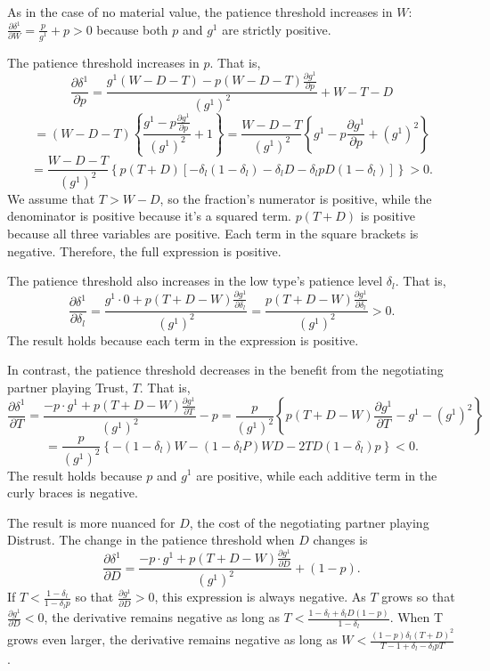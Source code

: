 \documentclass[bibtex,autowc]{apsr_submission}
\newcommand{\de}{\delta}
\begin{document}
{As in the case of no material value, the patience threshold increases in $W$: $\frac{\partial \delta^1}{\partial W} = \frac{p}{g^1} + p > 0$ because both $p$ and $g^1$ are strictly positive.

The patience threshold increases in $p$. That is, 
$$\frac{\partial \delta^1}{\partial p} = \frac{g^1 (W-D-T) - p(W-D-T)\frac{\partial g^1}{\partial p}}{\left(g^1\right)^2}+ W-T-D$$$$= (W-D-T)\left\{\frac{g^1  - p\frac{\partial g^1}{\partial p}}{\left(g^1\right)^2}+ 1\right\}=\frac{W-D-T	}{(g^1)^2}\left\{g^1  - p\frac{\partial g^1}{\partial p} + (g^1)^2\right\}$$
$$=\frac{W-D-T}{(g^1)^2}\left\{p(T+D)\left[-\de_l (1-\de_l) - \de_l D - \de_l p D(1-\de_l)\right]\right\} > 0.$$
We assume that $T > W - D$, so the fraction's numerator is positive, while the denominator is positive because it's a squared term. $p(T+D)$ is positive because all three variables are positive. Each term in the square brackets is negative. Therefore, the full expression is positive.

The patience threshold also increases in the low type's patience level $\de_l$. That is,
$$\frac{\partial \delta^1}{\partial \de_l} = \frac{g^1 \cdot 0 + p(T+D-W)\frac{\partial g^1}{\partial \de_l}}{\left(g^1\right)^2} = \frac{p(T+D-W)\frac{\partial g^1}{\partial \de_l}}{\left(g^1\right)^2} > 0.$$
The result holds because each term in the expression is positive.

In contrast, the patience threshold decreases in the benefit from the negotiating partner playing Trust, $T$. That is,
$$\frac{\partial \delta^1}{\partial T} = \frac{-p \cdot g^1 + p(T+D-W) \frac{\partial g^1}{\partial T}}{(g^1)^2}-p = \frac{p}{(g^1)^2}\left\{ p(T+D-W) \frac{\partial g^1}{\partial T} - g^1 -(g^1)^2 \right\}$$
$$= \frac{p}{(g^1)^2}\left\{-(1-\de_l)W - (1- \de_l P)WD -2TD(1-\de_l)p \right\} < 0.$$
The result holds because $p$ and $g^1$ are positive, while each additive term in the curly braces is negative.

The result is more nuanced for $D$, the cost of the negotiating partner playing Distrust. The change in the patience threshold when $D$ changes is 
$$\frac{\partial \delta^1}{\partial D} = \frac{-p \cdot g^1 + p(T+D-W) \frac{\partial g^1}{\partial D}}{(g^1)^2}+ (1-p).$$
If $T < \frac{1-\de_l}{1-\de_l p}$ so that $\frac{\partial g^1}{\partial D} > 0$, this expression is always negative. As $T$ grows so that $\frac{\partial g^1}{\partial D} < 0$, the derivative remains negative as long as $T < \frac{1-\de_l+ \de_l D(1-p)}{1-\de_l}$. When T grows even larger, the derivative remains negative as long as $W < \frac{(1-p)\de_l(T+D)^2}{T -1 + \de_l - \de_l p T}$.


}
\end{document}
